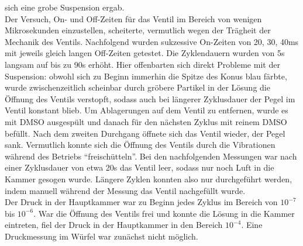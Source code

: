 sich eine grobe Suspension ergab.\\ 
Der Versuch, On- und Off-Zeiten für das Ventil im
Bereich von wenigen Mikrosekunden einzustellen,
scheiterte, vermutlich wegen der Trägheit der Mechanik des
Ventils. Nachfolgend wurden sukzessive
On-Zeiten von 20, 30, 40ms mit jeweils gleich
langen Off-Zeiten getestet. Die Zyklendauern
wurden von 5s langsam auf bis zu 90s erhöht.
Hier offenbarten sich direkt Probleme mit der
Suspension: obwohl sich zu Beginn immerhin die
Spitze des Konus blau färbte, wurde
zwischenzeitlich scheinbar durch gröbere Partikel
in der Lösung die Öffnung des Ventils verstopft,
sodass auch bei längerer Zyklusdauer der Pegel im
Ventil konstant blieb. Um Ablagerungen auf dem
Ventil zu entfernen, wurde es mit DMSO ausgespült
und danach für den nächsten Zyklus mit reinem
DMSO befüllt. Nach dem zweiten Durchgang öffnete
sich das Ventil wieder, der Pegel sank.
Vermutlich konnte sich die Öffnung des Ventils
durch die Vibrationen während des Betriebs
"`freischütteln"'. Bei den nachfolgenden
Messungen war nach einer Zyklusdauer von etwa 20s
das Ventil leer, sodass nur noch Luft in die
Kammer gesogen wurde.
Längere Zyklen konnten also nur durchgeführt
werden, indem manuell während der Messung das
Ventil nachgefüllt wurde.
\\
Der Druck in der Hauptkammer war zu Beginn jedes
Zyklus im Bereich von $10^{-7}$ bis $10^{-6}$.
War die Öffnung des Ventils frei und konnte die
Lösung in die Kammer eintreten, fiel der Druck in
der Hauptkammer in den Bereich $10^{-4}$. Eine
Druckmessung im Würfel war zunächst nicht möglich.\\
































